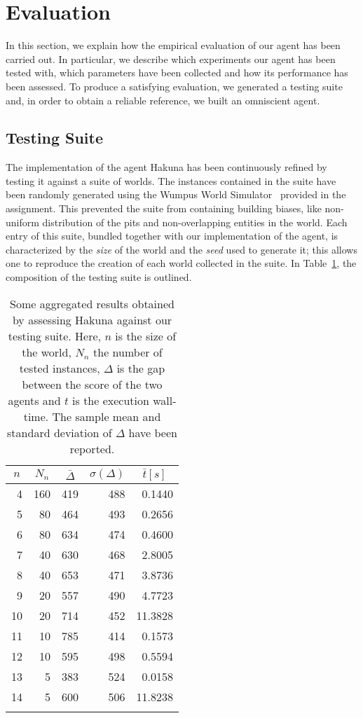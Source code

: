 \documentclass{llncs}
\begin{document}
\section{Evaluation}

In this section, we explain how the empirical evaluation of our agent has been carried out.
In particular, we describe which experiments our agent has been tested with, which parameters have been collected and how its performance has been assessed.
To produce a satisfying evaluation, we generated a testing suite and, in order to obtain a reliable reference, we built an omniscient agent.

\subsection{Testing Suite}

The implementation of the agent Hakuna has been continuously refined by testing it against a suite of worlds.
The instances contained in the suite have been randomly generated using the Wumpus World Simulator~\cite{WWS} provided in the assignment.
This prevented the suite from containing building biases, like non-uniform distribution of the pits and non-overlapping entities in the world.
Each entry of this suite, bundled together with our implementation of the agent, is characterized by the \emph{size} of the world and the \emph{seed} used to generate it; this allows one to reproduce the creation of each world collected in the suite.
In Table~\ref{tbl:test}, the composition of the testing suite is outlined.

\begin{table}[t]
	\label{tbl:test}
	\centering
	\begin{tabular}{rrrrr}
	\toprule
	\multicolumn{1}{c}{$n$} & \multicolumn{1}{c}{$N_n$} & \multicolumn{1}{c}{$\bar{\Delta}$} & \multicolumn{1}{c}{$\sigma(\Delta)$} & \multicolumn{1}{c}{$\bar{t} [s]$}\\
	\midrule
	 4 & 160 & 419 & 488 &  0.1440 \\
	 5 &  80 & 464 & 493 &  0.2656 \\
	 6 &  80 & 634 & 474 &  0.4600 \\
	 7 &  40 & 630 & 468 &  2.8005 \\
	 8 &  40 & 653 & 471 &  3.8736 \\
	 9 &  20 & 557 & 490 &  4.7723 \\
	10 &  20 & 714 & 452 & 11.3828 \\
	11 &  10 & 785 & 414 &  0.1573 \\
	12 &  10 & 595 & 498 &  0.5594 \\
	13 &   5 & 383 & 524 &  0.0158 \\
	14 &   5 & 600 & 506 & 11.8238 \\
	\bottomrule\\
	\end{tabular}
	\caption{Some aggregated results obtained by assessing Hakuna against our testing suite. Here, $n$ is the size of the world, $N_n$ the number of tested instances, $\Delta$ is the gap between the score of the two agents and $t$ is the execution wall-time. The sample mean and standard deviation of $\Delta$ have been reported.}
\end{table}
\end{document}
